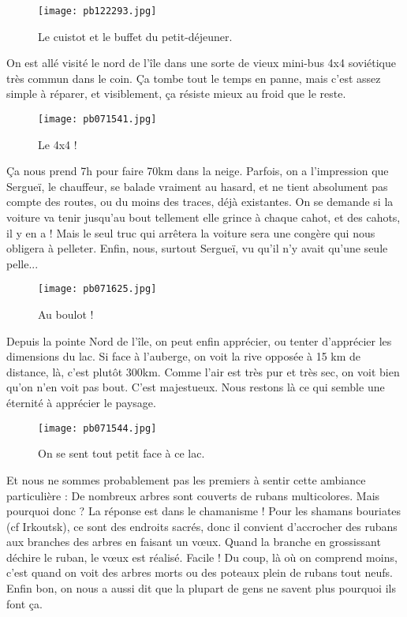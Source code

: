 \documentclass{book}
\begin{document}
\begin{figure}[h]
\centering
\texttt{[image: pb122293.jpg]}
\caption*{ Le cuistot et le buffet du petit-déjeuner.}
\end{figure}

On est allé visité le nord de l'île dans une sorte de vieux mini-bus 4x4 soviétique très commun dans le coin. Ça tombe tout le temps en panne, mais c'est assez simple à réparer, et visiblement, ça résiste mieux au froid que le reste.


\begin{figure}[h]
\centering
\texttt{[image: pb071541.jpg]}
\caption*{ Le 4x4 !}
\end{figure}

Ça nous prend 7h pour faire 70km dans la neige. Parfois, on a l'impression que Sergueï, le chauffeur, se balade vraiment au hasard, et ne tient absolument pas compte des routes, ou du moins des traces, déjà existantes. On se demande si la voiture va tenir jusqu'au bout tellement elle grince à chaque cahot, et des cahots, il y en a ! Mais le seul truc qui arrêtera la voiture sera une congère qui nous obligera à pelleter. Enfin, nous, surtout Sergueï, vu qu'il n'y avait qu'une seule pelle...


\begin{figure}[h]
\centering
\texttt{[image: pb071625.jpg]}
\caption*{ Au boulot !}
\end{figure}

Depuis la pointe Nord de l'île, on peut enfin apprécier, ou tenter d'apprécier les dimensions du lac. Si face à l'auberge, on voit la rive opposée à 15 km de distance, là, c'est plutôt 300km. Comme l'air est très pur et très sec, on voit bien qu'on n'en voit pas bout. C'est majestueux. Nous restons là ce qui semble une éternité à apprécier le paysage.


\begin{figure}[h]
\centering
\texttt{[image: pb071544.jpg]}
\caption*{ On se sent tout petit face à ce lac.}
\end{figure}

Et nous ne sommes probablement pas les premiers à sentir cette ambiance particulière : De nombreux arbres sont couverts de rubans multicolores. Mais pourquoi donc ? La réponse est dans le chamanisme ! Pour les shamans bouriates (cf Irkoutsk), ce sont des endroits sacrés, donc il convient d'accrocher des rubans aux branches des arbres en faisant un vœux. Quand la branche en grossissant déchire le ruban, le vœux est réalisé. Facile ! Du coup, là où on comprend moins, c'est quand on voit des arbres morts ou des poteaux plein de rubans tout neufs. Enfin bon, on nous a aussi dit que la plupart de gens ne savent plus pourquoi ils font ça.
\end{document}
